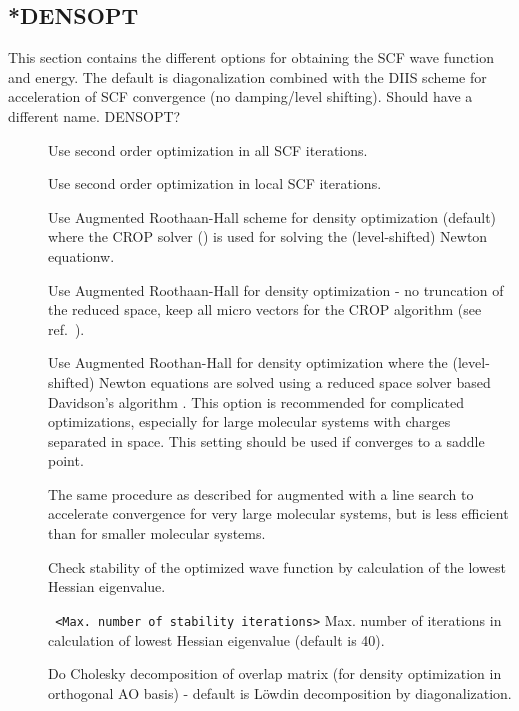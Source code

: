 \subsection{*DENSOPT}\label{subsec:densopt}
This section contains the different options for obtaining the SCF wave function
and energy. The default is diagonalization combined with the DIIS scheme for acceleration
of SCF convergence (no damping/level shifting). 
Should have a different name. DENSOPT?
\begin{description}
\item[] Use second order optimization in all SCF iterations.
\item[] Use second order optimization in local SCF iterations.
\item[] Use Augmented Roothaan-Hall scheme for density optimization 
(default)~\cite{ARH1,ARH2} where the CROP solver (\cite{crop}) is used for 
solving the (level-shifted) Newton equationw. 
\item[] Use Augmented Roothaan-Hall for density optimization -
no truncation of the reduced space, keep all micro vectors for the CROP algorithm 
(see ref.~\cite{crop}).
\item[] Use Augmented Roothan-Hall for density optimization where
the (level-shifted) Newton equations are solved using a reduced space solver based 
Davidson's algorithm \cite{davidson:1975}. This option
is recommended for complicated optimizations, especially for large molecular systems
 with charges separated in space. This setting should be used if  
converges to a saddle point. 
 \item[] The same procedure as described for  
augmented with a line search to accelerate convergence for very large molecular 
systems, but is less efficient than  for smaller molecular systems. 
\item[] Check stability of the optimized wave function by calculation
of the lowest Hessian eigenvalue. 
\item[] \verb| | \newline
\verb|<Max. number of stability iterations>|\newline
Max. number of iterations in calculation of lowest Hessian eigenvalue (default is 40).
\item[] Do Cholesky decomposition of overlap matrix (for density optimization
in orthogonal AO basis) - default is L{\"o}wdin decomposition by diagonalization.

\end{description}
